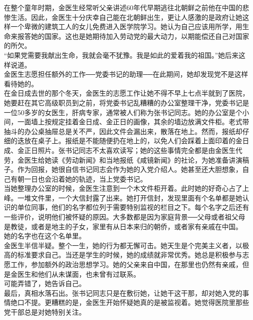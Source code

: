 在整个童年时期，金医生经常听父亲讲述60年代早期逃往北朝鲜之前他在中国的悲惨生活。因此，金医生十分庆幸自己能在北朝鲜出生，更让人感激的是政府让她这样一个卑微的建筑工人的女儿免费进入医学院学习。她认为自己应该用所学，用生命来报答她的国家。这也是她期待加入劳动党的最大动力，以期能偿还自己对国家的所欠。\\

“如果党需要我献出生命，我就会毫不犹豫。我是如此的爱着我的祖国。”她后来这样说道。\\

金医生志愿担任额外的工作──党委书记的助理──在此期间，她却发现党不是这样看待她的。\\

在金日成去世的那个冬天，金医生的志愿工作让她不得不早上七点半就到了医院，她要赶在其它高级职员到之前，将党委书记乱糟糟的办公室整理干净，党委书记是一位50多岁的女医生，肝病专家，通常被人们称为张书记同志。她的办公室是个小间，一面墙上按规定挂着金日成、金正日的画像，其余的墙边放满文件柜。老式带抽斗的办公桌抽屉总是关不严，因此文件会漏出来，散落在地上。然而，报纸却仔细的迭放在桌子上。报纸是不能随便扔在地上的，以免人们会踩着上面印着的金日成、金正日照片。张书记同志不太喜欢读写；她的这些事情完全都是由金医生代劳，金医生给她读《劳动新闻》和当地报纸《咸镜新闻》的社论，为她准备讲演稿子。作为回报，她很自信书记同志会作为她的入党介绍人。她甚至还大胆想象，自己有朝一日也会沿着她的轨迹，当上党委书记。\\

当她整理办公室的时候，金医生注意到一个木文件柜开着。此时她的好奇心占了上峰。一堆文件里，一个大信封露了出来。她打开信封，发现里面有个名单都是她认识的单位同事，他们的名字都位列于需要特别监视的栏目之下。每个名字之后还有一些评价，说明他们被怀疑的原因。大多数都是因为家庭背景──父母或者祖父母是教徒，或者是地主的子女，家里有从日本来归的朝侨，或者家有亲戚在中国。\\

她的名字也在这个名单里。\\

金医生半信半疑。整个一生，她的行为都无懈可击。她天生是个完美主义者，以极高的标准要求自己。当还是学生的时候，她的成绩就非常优秀。她总是积极参与志愿工作，参加额外的政治思想学习。她的父亲来自中国，在那里也仍然有亲戚，但是金医生和他们从未谋面，也未曾有过联系。\\

可能弄错了，她告诉自己。\\

最后，真相水落石出。张书记同志只是在敷衍她，让她干这干那，却对她入党的事情绝口不提。更糟糕的是，金医生开始怀疑她真的是被监视着。她觉得医院里那些党干部总是对她特别关注。\\

